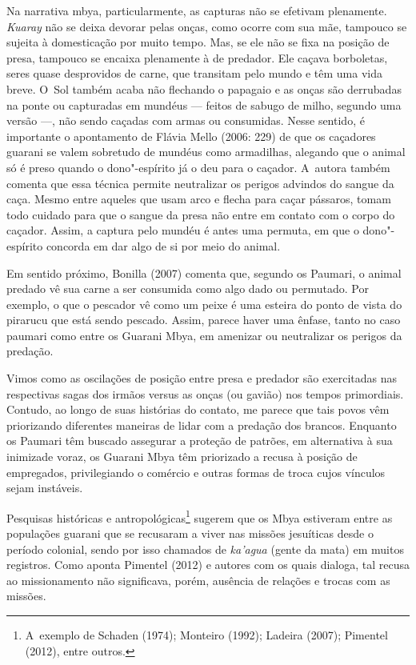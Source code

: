 Na narrativa mbya, particularmente, as capturas não se efetivam
plenamente. \emph{Kuaray} não se deixa devorar pelas onças, como ocorre com
sua mãe, tampouco se sujeita à domesticação por muito tempo. Mas, se
ele não se fixa na posição de presa, tampouco se encaixa plenamente à
de predador. Ele caçava borboletas, seres quase desprovidos de carne,
que transitam pelo mundo e têm uma vida breve. O~Sol também acaba não
flechando o papagaio e as onças são derrubadas na ponte ou capturadas
em mundéus --- feitos de sabugo de milho, segundo uma versão ---, não sendo
caçadas com armas ou consumidas. Nesse sentido, é importante o
apontamento de Flávia Mello (2006: 229) de que os caçadores guarani se
valem sobretudo de mundéus como armadilhas, alegando que o animal só é
preso quando o dono"-espírito já o deu para o caçador. A~autora também
comenta que essa técnica permite neutralizar os perigos advindos do
sangue da caça. Mesmo entre aqueles que usam arco e flecha para caçar
pássaros, tomam todo cuidado para que o sangue da presa não entre em
contato com o corpo do caçador. Assim, a captura pelo mundéu é antes
uma permuta, em que o dono"-espírito concorda em dar algo de si por meio
do animal.

Em sentido próximo, Bonilla (2007) comenta que, segundo os Paumari, o
animal predado vê sua carne a ser consumida como algo dado ou
permutado. Por exemplo, o que o pescador vê como um peixe é uma esteira
do ponto de vista do pirarucu que está sendo pescado. Assim, parece
haver uma ênfase, tanto no caso paumari como entre os Guarani Mbya, em
amenizar ou neutralizar os perigos da predação. 

Vimos como as oscilações de posição entre presa e predador são
exercitadas nas respectivas sagas dos irmãos versus as onças (ou
gavião) nos tempos primordiais. Contudo, ao longo de suas histórias do
contato, me parece que tais povos vêm priorizando diferentes maneiras
de lidar com a predação dos brancos. Enquanto os Paumari têm buscado
assegurar a proteção de patrões, em alternativa à sua inimizade voraz,
os Guarani Mbya têm priorizado a recusa à posição de empregados,
privilegiando o comércio e outras formas de troca cujos vínculos sejam
instáveis.

Pesquisas históricas e antropológicas\footnote{A~exemplo de Schaden
(1974); Monteiro (1992); Ladeira (2007); Pimentel (2012), entre
outros.} sugerem que os Mbya estiveram entre as populações guarani que
se recusaram a viver nas missões jesuíticas desde o período colonial,
sendo por isso chamados de \emph{ka’agua} (gente da mata) em muitos registros.
Como aponta Pimentel (2012) e autores com os quais dialoga, tal recusa
ao missionamento não significava, porém, ausência de relações e trocas
com as missões.

